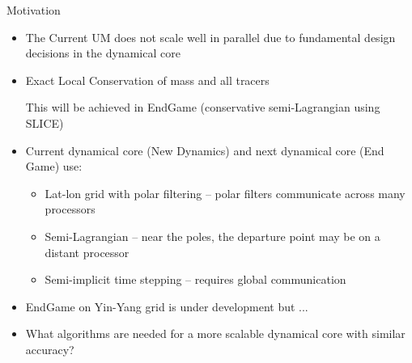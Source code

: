 \begin{slide}{Motivation}

\begin{itemize}

\item The Current UM does not scale well in parallel due to fundamental design decisions in the dynamical core

\item Exact Local Conservation of mass and all tracers

This will be achieved in EndGame (conservative semi-Lagrangian using SLICE)

\end{itemize}


\begin{itemize}
\item Current dynamical core (New Dynamics) and next dynamical core (End Game) use:

\begin{itemize}
\item Lat-lon grid with polar filtering -- polar filters communicate across many processors
\item Semi-Lagrangian -- near the poles, the departure point may be on a distant processor
\item Semi-implicit time stepping -- requires global communication
\end{itemize}

\item EndGame on Yin-Yang grid is under development but ...

\item What algorithms are needed for a more scalable dynamical core with similar accuracy?

\end{itemize}

\end{slide}
